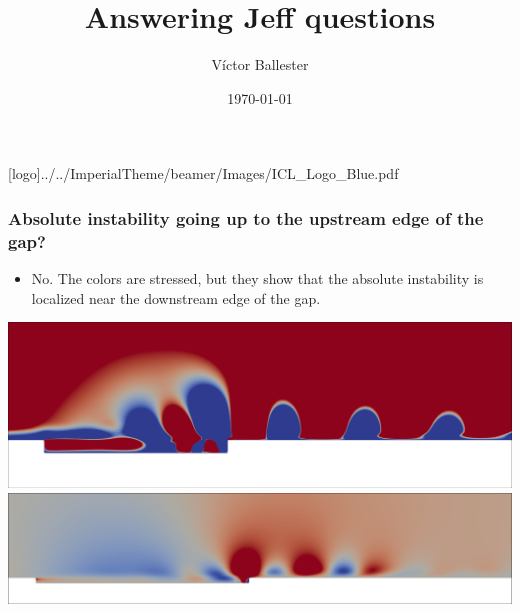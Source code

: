 \documentclass[
  aspectratio=169, %
  t, %
  onlytextwidth, %
  10pt, %
]{beamer}
\title{Answering Jeff questions} %
\subtitle{} %
\author{Víctor Ballester} %
\date{\today} %
\def\imagefolder{../../ImperialTheme/beamer/Images}
\begin{document}
\begingroup
{} %
[logo]{\imagefolder/ICL_Logo_Blue.pdf} %
\frame[plain, s]{\titlepage} %
\endgroup

\begin{frame}
	\frametitle{Absolute instability going up to the upstream edge of the gap?}
	\begin{itemize}
		\item No. The colors are stressed, but they show that the absolute instability is localized near the downstream edge of the gap.
	\end{itemize}
	\centering
	\includegraphics[width=0.75\linewidth]{Images/d2.25_w32.png}
	\includegraphics[width=0.75\linewidth]{Images/d1.5_w58.png}
\end{frame}
\end{document}
